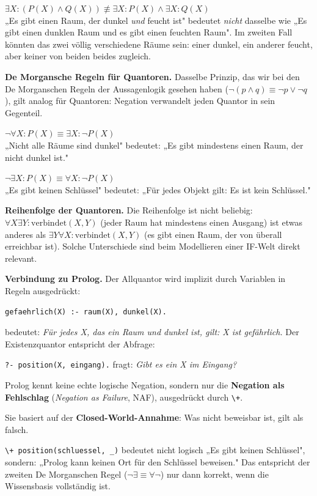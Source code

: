 \documentclass[parskip=half,a4paper,11pt]{scrreprt}
\begin{document}
$\exists X\colon (P(X) \land Q(X)) \not\equiv \exists X\colon P(X) \land \exists X\colon Q(X)$\\
„Es gibt einen Raum, der dunkel \textit{und} feucht ist" bedeutet \textit{nicht} dasselbe wie „Es gibt einen dunklen Raum und es gibt einen feuchten Raum". Im zweiten Fall könnten das zwei völlig verschiedene Räume sein: einer dunkel, ein anderer feucht, aber keiner von beiden beides zugleich.

\textbf{De Morgansche Regeln für Quantoren.} Dasselbe Prinzip, das wir bei den De Morganschen Regeln der Aussagenlogik gesehen haben ($\neg(p \land q) \equiv \neg p \lor \neg q$), gilt analog für Quantoren: Negation verwandelt jeden Quantor in sein Gegenteil.

$\neg \forall X\colon P(X) \equiv \exists X\colon \neg P(X)$\\
„Nicht alle Räume sind dunkel" bedeutet: „Es gibt mindestens einen Raum, der nicht dunkel ist."

$\neg \exists X\colon P(X) \equiv \forall X\colon \neg P(X)$\\
„Es gibt keinen Schlüssel" bedeutet: „Für jedes Objekt gilt: Es ist kein Schlüssel."

\textbf{Reihenfolge der Quantoren.} Die Reihenfolge ist nicht beliebig: $\forall X \exists Y\colon \text{verbindet}(X, Y)$ (jeder Raum hat mindestens einen Ausgang) ist etwas anderes als $\exists Y \forall X\colon \text{verbindet}(X, Y)$ (es gibt einen Raum, der von überall erreichbar ist). Solche Unterschiede sind beim Modellieren einer IF-Welt direkt relevant.

\textbf{Verbindung zu Prolog.} Der Allquantor wird implizit durch Variablen in Regeln ausgedrückt:

\texttt{gefaehrlich(X) :- raum(X), dunkel(X).}

bedeutet: \textit{Für jedes X, das ein Raum und dunkel ist, gilt: X ist gefährlich.} Der Existenzquantor entspricht der Abfrage:

\texttt{?- position(X, eingang).} fragt: \textit{Gibt es ein X im Eingang?}

Prolog kennt keine echte logische Negation, sondern nur die \textbf{Negation als Fehlschlag} (\textit{Negation as Failure}, NAF), ausgedrückt durch \texttt{\textbackslash+}. 

Sie basiert auf der \textbf{Closed-World-Annahme}: Was nicht beweisbar ist, gilt als falsch. 

\texttt{\textbackslash+ position(schluessel, \_)} bedeutet nicht logisch „Es gibt keinen Schlüssel", sondern: „Prolog kann keinen Ort für den Schlüssel beweisen." Das entspricht der zweiten De Morganschen Regel ($\neg \exists \equiv \forall \neg$) nur dann korrekt, wenn die Wissensbasis vollständig ist.
\end{document}
